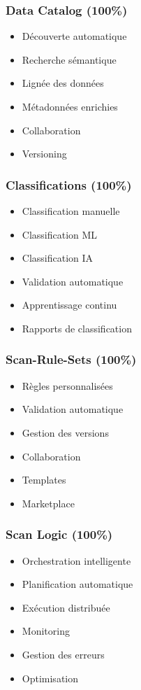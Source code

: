 \documentclass[12pt,a4paper]{article}
\begin{document}
\subsubsection{Data Catalog (100\%)}
\begin{itemize}
    \item Découverte automatique
    \item Recherche sémantique
    \item Lignée des données
    \item Métadonnées enrichies
    \item Collaboration
    \item Versioning
\end{itemize}

\subsubsection{Classifications (100\%)}
\begin{itemize}
    \item Classification manuelle
    \item Classification ML
    \item Classification IA
    \item Validation automatique
    \item Apprentissage continu
    \item Rapports de classification
\end{itemize}

\subsubsection{Scan-Rule-Sets (100\%)}
\begin{itemize}
    \item Règles personnalisées
    \item Validation automatique
    \item Gestion des versions
    \item Collaboration
    \item Templates
    \item Marketplace
\end{itemize}

\subsubsection{Scan Logic (100\%)}
\begin{itemize}
    \item Orchestration intelligente
    \item Planification automatique
    \item Exécution distribuée
    \item Monitoring
    \item Gestion des erreurs
    \item Optimisation
\end{itemize}
\end{document}
